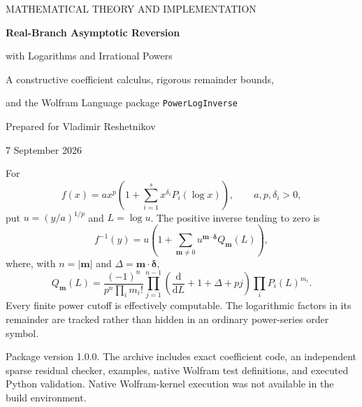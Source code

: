 \documentclass[11pt,a4paper]{article}
\numberwithin{equation}{section}
\theoremstyle{definition}
\theoremstyle{remark}
\newcommand{\dd}{\mathrm d}
\begin{document}
\begin{titlepage}
\vspace*{14mm}
{\color{quiet}\large MATHEMATICAL THEORY AND IMPLEMENTATION\par}
\vspace{8mm}
{\Huge\bfseries Real-Branch Asymptotic Reversion\par}
\vspace{4mm}
{\LARGE with Logarithms and Irrational Powers\par}
\vspace{9mm}
{\large A constructive coefficient calculus, rigorous remainder bounds,\par
 and the Wolfram Language package \texttt{PowerLogInverse}\par}
\vspace{12mm}
{\large Prepared for Vladimir Reshetnikov\par}
{\large 7 September 2026\par}
\vspace{13mm}
\begin{resultbox}
For
\[
 f(x)=a x^p\left(1+\sum_{i=1}^{s}x^{\delta_i}P_i(\log x)\right),
 \qquad a,p,\delta_i>0,
\]
put $u=(y/a)^{1/p}$ and $L=\log u$. The positive inverse tending to zero is
\[
 f^{-1}(y)=u\left(1+\sum_{\boldsymbol m\ne0}
 u^{\boldsymbol m\cdot\boldsymbol\delta}Q_{\boldsymbol m}(L)\right),
\]
where, with $n=|\boldsymbol m|$ and $\Delta=\boldsymbol m\cdot\boldsymbol\delta$,
\[
 Q_{\boldsymbol m}(L)=
 \frac{(-1)^n}{p^n\prod_i m_i!}
 \prod_{j=1}^{n-1}\left(\frac{\dd}{\dd L}+1+\Delta+pj\right)
 \prod_i P_i(L)^{m_i}.
\]
Every finite power cutoff is effectively computable. The logarithmic
factors in its remainder are tracked rather than hidden in an ordinary
power-series order symbol.
\end{resultbox}
\vfill
{\small Package version 1.0.0. The archive includes exact coefficient code,
 an independent sparse residual checker, examples, native Wolfram test
 definitions, and executed Python validation. Native Wolfram-kernel execution
 was not available in the build environment.\par}
\end{titlepage}
\end{document}
